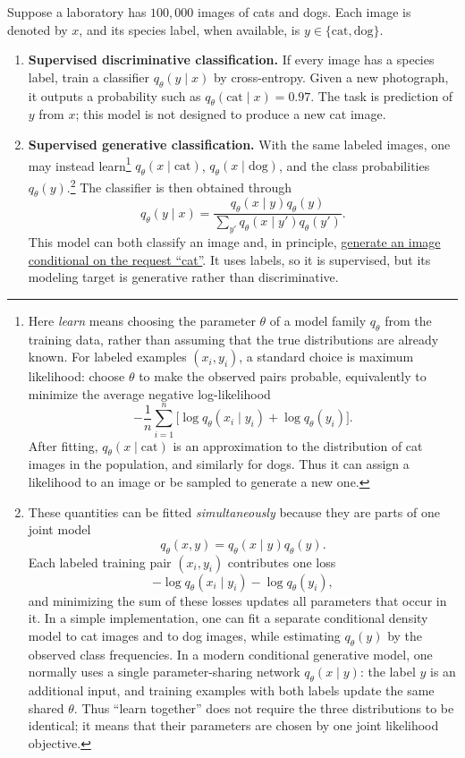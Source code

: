 \documentclass[11pt,a4paper]{article}
\theoremstyle{definition}
\begin{document}
\begin{example}
Suppose a laboratory has $100{,}000$ images of cats and dogs. Each image is denoted by
$x$, and its species label, when available, is $y\in\{\text{cat},\text{dog}\}$.

\begin{enumerate}
    \item \textbf{Supervised discriminative classification.} If every image has a species
    label, train a classifier $q_\theta(y\mid x)$ by cross-entropy. Given a new photograph,
    it outputs a probability such as $q_\theta(\text{cat}\mid x)=0.97$. The task is
    prediction of $y$ from $x$; this model is not designed to produce a new cat image.

    \item \textbf{Supervised generative classification.} With the same labeled images, one
    may instead learn\footnote{Here \emph{learn} means choosing the parameter $\theta$ of a
    model family $q_\theta$ from the training data, rather than assuming that the true
    distributions are already known. For labeled examples $(x_i,y_i)$, a standard choice is
    maximum likelihood: choose $\theta$ to make the observed pairs probable, equivalently to
    minimize the average negative log-likelihood
    \[
    -\frac{1}{n}\sum_{i=1}^n
    \bigl[\log q_\theta(x_i\mid y_i)+\log q_\theta(y_i)\bigr].
    \]
    After fitting, $q_\theta(x\mid\text{cat})$ is an approximation to the distribution of
    cat images in the population, and similarly for dogs. Thus it can assign a likelihood to
    an image or be sampled to generate a new one.} $q_\theta(x\mid\text{cat})$,
    $q_\theta(x\mid\text{dog})$, and the
    class probabilities $q_\theta(y)$.\footnote{These quantities can be fitted
    \emph{simultaneously} because they are parts of one joint model
    \[
    q_\theta(x,y)=q_\theta(x\mid y)q_\theta(y).
    \]
    Each labeled training pair $(x_i,y_i)$ contributes one loss
    \[
    -\log q_\theta(x_i\mid y_i)-\log q_\theta(y_i),
    \]
    and minimizing the sum of these losses updates all parameters that occur in it. In a
    simple implementation, one can fit a separate conditional density model to cat images
    and to dog images, while estimating $q_\theta(y)$ by the observed class frequencies.
    In a modern conditional generative model, one normally uses a single parameter-sharing
    network $q_\theta(x\mid y)$: the label $y$ is an additional input, and training examples
    with both labels update the same shared $\theta$. Thus ``learn together'' does not require
    the three distributions to be identical; it means that their parameters are chosen by one
    joint likelihood objective.} The classifier is then obtained through
    \[
    q_\theta(y\mid x)
    =\frac{q_\theta(x\mid y)q_\theta(y)}
    {\sum_{y'}q_\theta(x\mid y')q_\theta(y')}.
    \]
    This model can both classify an image and, in principle,
    \hyperref[ex:supervised-cat-generation]{generate an image conditional on the request
    ``cat''}. It uses labels, so it is supervised, but its modeling target is
    generative rather than discriminative.


\end{enumerate}
\end{example}
\end{document}
